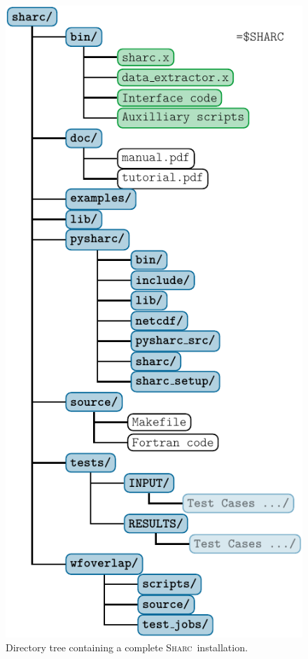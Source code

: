 \documentclass[a4paper,10pt,DIV=15,openany]{scrbook}
\newcommand{\sharc}{\textsc{Sharc}}
\begin{document}
\begin{figure}[htb]
  \centering
  \includegraphics[scale=1]{img/dirs_SHARC/dirs_SHARC.pdf}
  \caption{Directory tree containing a complete \sharc\ installation.}
  \label{fig:installation}
\end{figure}
\end{document}
